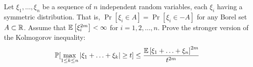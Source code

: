 \begin{problem}{5}
    Let $\xi_1,\ldots,\xi_n$ be a sequence of $n$ independent random variables, each $\xi_i$ having a symmetric distribution. That is, $\Pr[\xi_i \in A] = \Pr[\xi_i \in -A]$ for any Borel set $A \subset \mathbb{R}$. Assume that $\mathbb{E}\left[\xi_i^{2m}\right] < \infty$ for $i = 1,2,\ldots,n$. Prove the stronger version of the Kolmogorov inequality:
    \[
        \mathbb{P}[\max_{1\leq k \leq n} |\xi_1 +\ldots+\xi_k| \geq t] \leq \frac{\mathbb{E}\left[\xi_1+\ldots+\xi_n\right]^{2m}}{t^{2m}} 
    \]
\end{problem}
\begin{solution}
    
\end{solution}